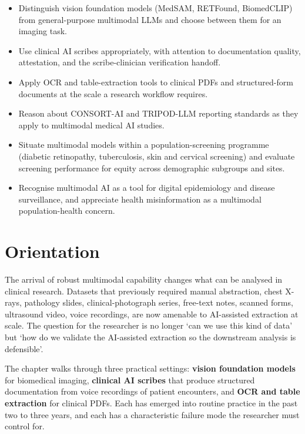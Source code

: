 \documentclass[
  letterpaper,
  11pt]{scrbook}
\providecommand{\tightlist}{%
  \setlength{\itemsep}{0pt}\setlength{\parskip}{0pt}}
\begin{document}
\begin{itemize}
\tightlist
\item
  Distinguish vision foundation models (MedSAM, RETFound, BiomedCLIP)
  from general-purpose multimodal LLMs and choose between them for an
  imaging task.
\item
  Use clinical AI scribes appropriately, with attention to documentation
  quality, attestation, and the scribe-clinician verification handoff.
\item
  Apply OCR and table-extraction tools to clinical PDFs and
  structured-form documents at the scale a research workflow requires.
\item
  Reason about CONSORT-AI and TRIPOD-LLM reporting standards as they
  apply to multimodal medical AI studies.
\item
  Situate multimodal models within a population-screening programme
  (diabetic retinopathy, tuberculosis, skin and cervical screening) and
  evaluate screening performance for equity across demographic subgroups
  and sites.
\item
  Recognise multimodal AI as a tool for digital epidemiology and disease
  surveillance, and appreciate health misinformation as a multimodal
  population-health concern.
\end{itemize}

\section{Orientation}\label{orientation-6}

The arrival of robust multimodal capability changes what can be analysed
in clinical research. Datasets that previously required manual
abstraction, chest X-rays, pathology slides, clinical-photograph series,
free-text notes, scanned forms, ultrasound video, voice recordings, are
now amenable to AI-assisted extraction at scale. The question for the
researcher is no longer `can we use this kind of data' but `how do we
validate the AI-assisted extraction so the downstream analysis is
defensible'.

The chapter walks through three practical settings: \textbf{vision
foundation models} for biomedical imaging, \textbf{clinical AI scribes}
that produce structured documentation from voice recordings of patient
encounters, and \textbf{OCR and table extraction} for clinical PDFs.
Each has emerged into routine practice in the past two to three years,
and each has a characteristic failure mode the researcher must control
for.
\end{document}
